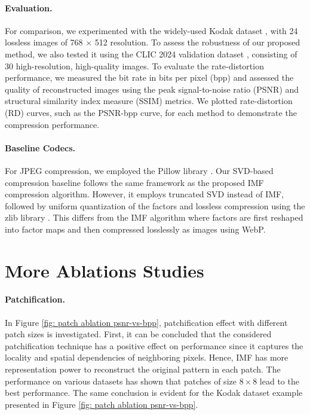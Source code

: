 \paragraph{Evaluation.} For comparison, we experimented with the widely-used Kodak dataset \cite{kodak1993}, with 24 lossless images of 768 × 512 resolution. To assess the robustness of our proposed method, we also tested it using the CLIC 2024 validation dataset \cite{clic2024}, consisting of 30 high-resolution, high-quality images. To evaluate the rate-distortion performance, we measured the bit rate in bits per pixel (bpp) and assessed the quality of reconstructed images using the peak signal-to-noise ratio (PSNR) and structural similarity index measure (SSIM) metrics. We plotted rate-distortion (RD) curves, such as the PSNR-bpp curve, for each method to demonstrate the compression performance.

\paragraph{Baseline Codecs.} For JPEG compression, we employed the Pillow library \cite{clark2015pillow}. Our SVD-based compression baseline follows the same framework as the proposed IMF compression algorithm. However, it employs truncated SVD instead of IMF, followed by uniform quantization of the factors and lossless compression using the zlib library \cite{deutsch1996zlib}. This differs from the IMF algorithm where factors are first reshaped into factor maps and then compressed losslessly as images using WebP.

\section{More Ablations Studies}

\paragraph{Patchification.} 
In Figure \ref{fig: patch ablation psnr-vs-bpp}, patchification effect with different patch sizes is investigated.
First, it can be concluded that the considered patchification technique has a positive effect on performance since it captures the locality and spatial dependencies of neighboring pixels. Hence, IMF has more representation power to reconstruct the original pattern in each patch.
The performance on various datasets has shown that patches of size $8\times 8$ lead to the best performance. The same conclusion is evident for the Kodak dataset example presented in Figure \ref{fig: patch ablation psnr-vs-bpp}.

